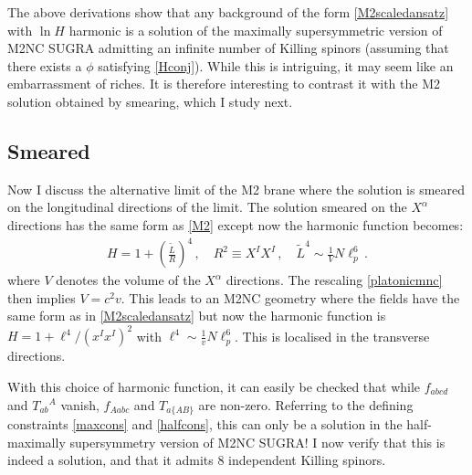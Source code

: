 \documentclass[11pt]{article}
\newcommand{\be}{\begin{equation}}
\newcommand{\ee}{\end{equation}}
\numberwithin{equation}{section}
\begin{document}
{{The above derivations show that any background of the form \eqref{M2scaledansatz} with $\ln H$ harmonic is a solution of the maximally supersymmetric version of M2NC SUGRA admitting an infinite number of Killing spinors (assuming that there exists a $\phi$ satisfying \eqref{Hconj}). While this is intriguing, it may seem like an embarrassment of riches.
It is therefore interesting to contrast it with the M2 solution obtained by smearing, which I study next.

\subsection{Smeared}
\label{sec:M2smeared} 

Now I discuss the alternative limit of the M2 brane where the solution is smeared on the longitudinal directions of the limit.
The solution smeared on the $X^\alpha$ directions has the same form as \eqref{M2} except now the harmonic function becomes:
\be
\begin{split} 
H  = 1 + \left( \frac{\tilde L}{R} \right)^4 \,,\quad R^2 \equiv X^I X^I \,,\quad  \tilde L^4 \sim \frac{1}{V} N \ell_p^6 \,.
\end{split}
\ee
where $V$ denotes the volume of the $X^\alpha$ directions.
The rescaling \eqref{platonicmnc} then implies $V = c^2 v$.
This leads to an M2NC geometry where the fields have the same form as in \eqref{M2scaledansatz} but now the harmonic function is $H = 1 + \ell^4/(x^Ix^I)^2$
with $\ell^4 \sim \frac{1}{v} N \ell_p^6$.
This is localised in the transverse directions.

With this choice of harmonic function, it can easily be checked that while $f_{abcd}$ and $T_{ab}{}^A$ vanish, $f_{Aabc}$ and $T_{a\{AB\}}$ are non-zero.
Referring to the defining constraints \eqref{maxcons} and \eqref{halfcons}, this can only be a solution in the half-maximally supersymmetry version of M2NC SUGRA! 
I now verify that this is indeed a solution, and that it admits 8 independent Killing spinors.

}}
\end{document}
